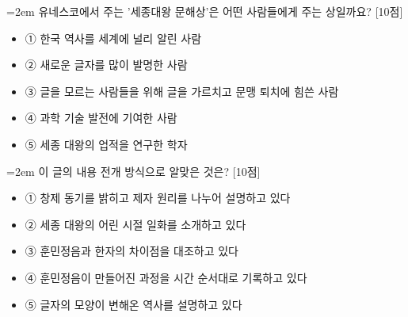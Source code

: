 \documentclass[12pt,a4paper]{article}
\newcommand{\qnum}[1]{%
  \tikz[baseline=(num.base)]{%
    \node[circle, fill=numCircle, text=white, inner sep=0pt,
          minimum size=18pt, font=\small\bfseries] (num) {#1};%
  }%
}
\newcommand{\pts}[1]{%
  \hfill\textcolor{ptsBadge}{[#1점]}%
}
\begin{document}
\vspace{4mm}
\begin{minipage}{\columnwidth}
{\hangindent=2em
\qnum{47}\enspace 유네스코에서 주는 '세종대왕 문해상'은 어떤 사람들에게 주는 상일까요? \pts{10}
\par}

\vspace{3mm}
\begin{itemize}[leftmargin=2.5em, labelsep=0.3em, label={}, itemsep=4pt, parsep=1pt, topsep=0pt]
  \item ① 한국 역사를 세계에 널리 알린 사람
  \item ② 새로운 글자를 많이 발명한 사람
  \item ③ 글을 모르는 사람들을 위해 글을 가르치고 문맹 퇴치에 힘쓴 사람
  \item ④ 과학 기술 발전에 기여한 사람
  \item ⑤ 세종 대왕의 업적을 연구한 학자
\end{itemize}
\end{minipage}
\vspace{4mm}

\vspace{4mm}
\begin{minipage}{\columnwidth}
{\hangindent=2em
\qnum{48}\enspace 이 글의 내용 전개 방식으로 알맞은 것은? \pts{10}
\par}

\vspace{3mm}
\begin{itemize}[leftmargin=2.5em, labelsep=0.3em, label={}, itemsep=4pt, parsep=1pt, topsep=0pt]
  \item ① 창제 동기를 밝히고 제자 원리를 나누어 설명하고 있다
  \item ② 세종 대왕의 어린 시절 일화를 소개하고 있다
  \item ③ 훈민정음과 한자의 차이점을 대조하고 있다
  \item ④ 훈민정음이 만들어진 과정을 시간 순서대로 기록하고 있다
  \item ⑤ 글자의 모양이 변해온 역사를 설명하고 있다
\end{itemize}
\end{minipage}
\vspace{4mm}
\end{document}
